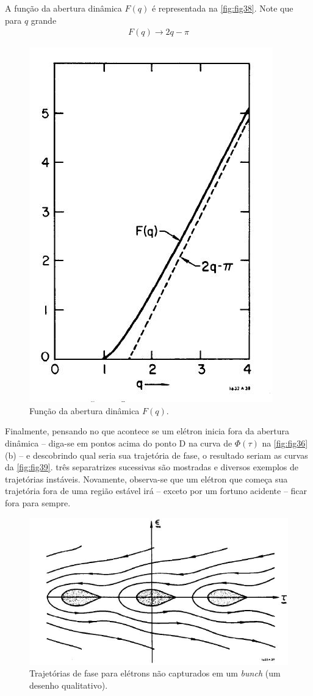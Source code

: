 A função da abertura dinâmica $F(q)$ é representada na \autoref{fig:fig38}. Note que para $q$ grande
\begin{align}
	F(q) \rightarrow 2q-\pi
\end{align}

\begin{figure}[!htb]
	\centering
	\includegraphics[width=0.5\linewidth]{./Figuras/fig38.jpeg}
	\caption{Função da abertura dinâmica $F(q)$.}
	\label{fig:fig38}
\end{figure}

Finalmente, pensando no que acontece se um elétron inicia fora da abertura dinâmica --  diga-se em pontos acima do ponto D na curva de $\Phi(\tau)$ na \autoref{fig:fig36}(b) -- e descobrindo qual seria sua trajetória de fase, o resultado seriam as curvas da \autoref{fig:fig39}. três separatrizes sucessivas são mostradas e diversos exemplos de trajetórias instáveis. Novamente, observa-se que um elétron que começa sua trajetória fora de uma região estável irá -- exceto por um fortuno acidente -- ficar fora para sempre.

\begin{figure}[!htb]
	\centering
	\includegraphics[width=0.7\linewidth]{./Figuras/fig39.jpeg}
	\caption{Trajetórias de fase para elétrons não capturados em um \textit{bunch} (um desenho qualitativo).}
	\label{fig:fig39}
\end{figure}